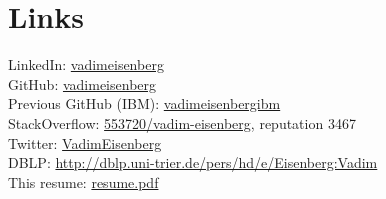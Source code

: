 \documentclass[]{deedy-resume}
\begin{document}
\begin{minipage}[t]{0.66\textwidth}
\section{Links}
LinkedIn:  \href{https://www.linkedin.com/in/vadimeisenberg}{vadimeisenberg} \\
GitHub: \href{https://github.com/vadimeisenberg}{vadimeisenberg} \\
Previous GitHub (IBM): \href{https://github.com/vadimeisenbergibm}{vadimeisenbergibm} \\
StackOverflow: \href{http://stackoverflow.com/users/553720/vadim-eisenberg}{553720/vadim-eisenberg}, reputation 3467 \\
Twitter: \href{https://twitter.com/VadimEisenberg}{VadimEisenberg} \\
DBLP: \href{http://dblp.uni-trier.de/pers/hd/e/Eisenberg:Vadim}{http://dblp.uni-trier.de/pers/hd/e/Eisenberg:Vadim} \\
This resume: \href{https://github.com/VadimEisenberg/resume/raw/gh-pages/resume.pdf}{resume.pdf}

%
%




\end{minipage}
\end{document}
